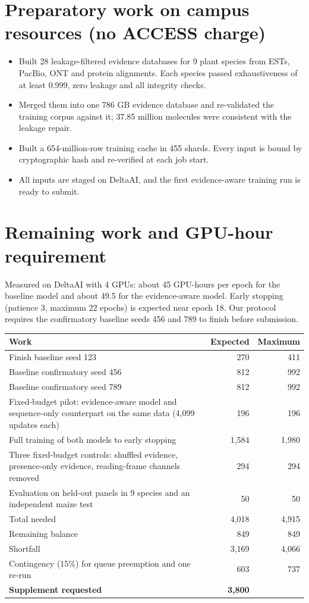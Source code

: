 \documentclass[11pt]{article}
\begin{document}
\section{Preparatory work on campus resources (no ACCESS charge)}
\begin{itemize}
\item Built 28 leakage-filtered evidence databases for 9 plant species from ESTs, PacBio, ONT and protein alignments. Each species passed exhaustiveness of at least 0.999, zero leakage and all integrity checks.
\item Merged them into one 786 GB evidence database and re-validated the training corpus against it; 37.85 million molecules were consistent with the leakage repair.
\item Built a 654-million-row training cache in 455 shards. Every input is bound by cryptographic hash and re-verified at each job start.
\item All inputs are staged on DeltaAI, and the first evidence-aware training run is ready to submit.
\end{itemize}

\section{Remaining work and GPU-hour requirement}
Measured on DeltaAI with 4 GPUs: about 45 GPU-hours per epoch for the baseline model and about 49.5 for the evidence-aware model. Early stopping (patience 3, maximum 22 epochs) is expected near epoch 18. Our protocol requires the confirmatory baseline seeds 456 and 789 to finish before submission.

\begin{tabularx}{\linewidth}{Xrr}\toprule
Work & Expected & Maximum\\\midrule
Finish baseline seed 123 & 270 & 411\\
Baseline confirmatory seed 456 & 812 & 992\\
Baseline confirmatory seed 789 & 812 & 992\\
Fixed-budget pilot: evidence-aware model and sequence-only counterpart on the same data (4,099 updates each) & 196 & 196\\
Full training of both models to early stopping & 1,584 & 1,980\\
Three fixed-budget controls: shuffled evidence, presence-only evidence, reading-frame channels removed & 294 & 294\\
Evaluation on held-out panels in 9 species and an independent maize test & 50 & 50\\\midrule
Total needed & 4,018 & 4,915\\
Remaining balance & 849 & 849\\
Shortfall & 3,169 & 4,066\\
Contingency (15\%) for queue preemption and one re-run & 603 & 737\\\midrule
\textbf{Supplement requested} & \textbf{3,800} & \\\bottomrule
\end{tabularx}
\end{document}
